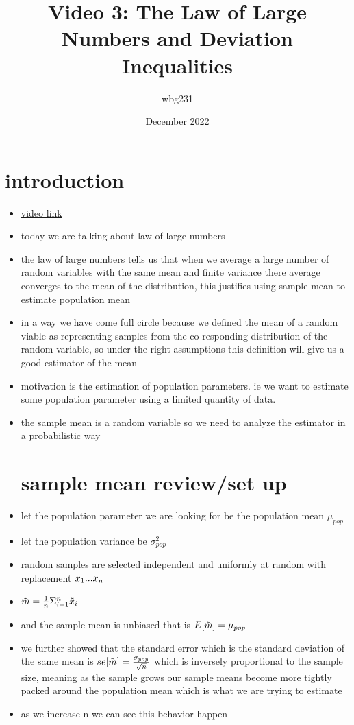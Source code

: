 \documentclass{article}
\title{Video 3: The Law of Large Numbers and Deviation Inequalities}
\author{wbg231 }
\date{December 2022}
\begin{document}
\maketitle

\section{introduction}
\begin{itemize}
\item \href{https://www.youtube.com/watch?v=MmqywUdajQs&list=PLBEf5mJtE6KuZ5NBQMuWIMsiOOrV9ibzm&index=68}{video link}
\item today we are talking about law of large numbers
\item the law of large numbers tells us that when we average a large number of random variables with the same mean and finite variance there average converges to the mean of the distribution, this justifies using sample mean to estimate population mean 
\item in a way we have come full circle because we defined the mean of a random viable as representing samples from the co responding distribution of the random variable, so under the right assumptions this definition will give us a good estimator of the mean 
\item motivation is the estimation of population parameters. ie we want to estimate some population parameter using a limited quantity of data. 
\item the sample mean is a random variable so we need to analyze the estimator in a  probabilistic way
\section{sample mean review/set up }
\item let the population parameter we are looking for be the population mean $\mu_{pop}$
\item let the population variance be $\sigma^2_{pop}$
\item  random samples are selected independent and uniformly at random with replacement $\Tilde{x}_{1}...\Tilde{x}_{n}$
\item $\Tilde{m}=\frac{1}{n}\Sigma_{i=1}^{n}\Tilde{x}_{i}$
\item and the sample mean is unbiased that is $E[\Tilde{m}]=\mu_{pop}$
\item we further showed that the standard error which is the standard deviation of the same mean is $se[\Tilde{m}]=\frac{\sigma_{pop}}{\sqrt{n}}$ which is inversely proportional to the sample size, meaning as the sample grows our sample means become more tightly packed around the population mean which is what we are trying to estimate
\item as we increase n we can see this behavior happen 

\end{itemize}
\end{document}
